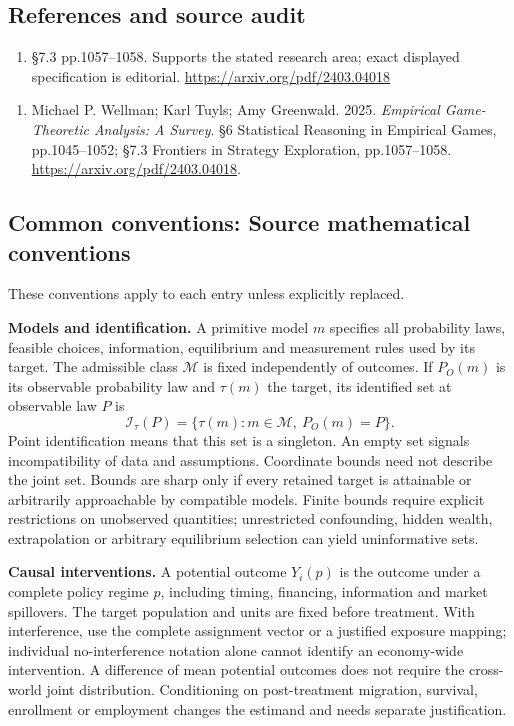 \documentclass[11pt,a4paper]{article}
\begin{document}
\subsection*{References and source audit}
\begin{enumerate}
\item §7.3 pp.1057–1058. Supports the stated research area; exact displayed specification is editorial. \url{https://arxiv.org/pdf/2403.04018}
\end{enumerate}
\begin{enumerate}\raggedright
\item\hypertarget{definitions:source:30007571:1}{} Michael P. Wellman; Karl Tuyls; Amy Greenwald. 2025. \emph{Empirical Game-Theoretic Analysis: A Survey}. §6 Statistical Reasoning in Empirical Games, pp.1045–1052; §7.3 Frontiers in Strategy Exploration, pp.1057–1058.
\url{https://arxiv.org/pdf/2403.04018}.
\end{enumerate}

\subsection*{Common conventions: Source mathematical conventions}

These conventions apply to each entry unless explicitly replaced.

\textbf{Models and identification.} A primitive model \(m\) specifies all probability laws, feasible choices, information, equilibrium and measurement rules used by its target. The admissible class \(\mathcal M\) is fixed independently of outcomes. If \(P_O(m)\) is its observable probability law and \(\tau(m)\) the target, its identified set at observable law \(P\) is
\[
 \mathcal I_\tau(P)=\{\tau(m):m\in\mathcal M,\ P_O(m)=P\}.
\]
Point identification means that this set is a singleton. An empty set signals incompatibility of data and assumptions. Coordinate bounds need not describe the joint set. Bounds are sharp only if every retained target is attainable or arbitrarily approachable by compatible models. Finite bounds require explicit restrictions on unobserved quantities; unrestricted confounding, hidden wealth, extrapolation or arbitrary equilibrium selection can yield uninformative sets.

\textbf{Causal interventions.} A potential outcome \(Y_i(p)\) is the outcome under a complete policy regime \(p\), including timing, financing, information and market spillovers. The target population and units are fixed before treatment. With interference, use the complete assignment vector or a justified exposure mapping; individual no-interference notation alone cannot identify an economy-wide intervention. A difference of mean potential outcomes does not require the cross-world joint distribution. Conditioning on post-treatment migration, survival, enrollment or employment changes the estimand and needs separate justification.
\end{document}
